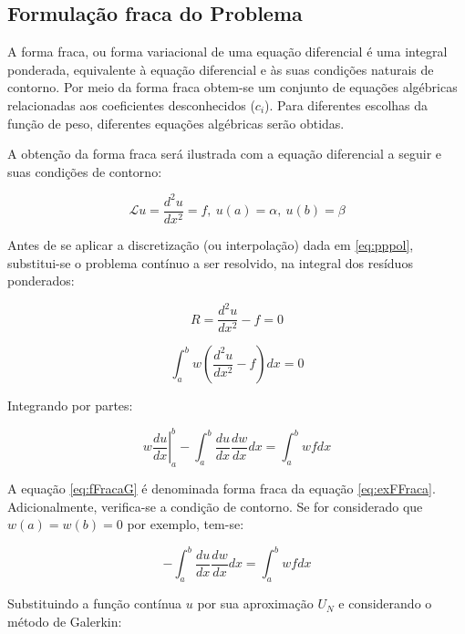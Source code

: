 \subsection{Formulação fraca do Problema}

A forma fraca, ou forma variacional de uma equação diferencial é uma integral ponderada, equivalente à equação diferencial e às suas condições naturais de contorno. Por meio da forma fraca obtem-se um conjunto de equações algébricas relacionadas aos coeficientes desconhecidos ($c_i$). Para diferentes escolhas da função de peso, diferentes equações algébricas serão obtidas.
\citep[p. 64]{reddy}

A obtenção da forma fraca será ilustrada com a equação diferencial a seguir e suas condições de contorno:

\begin{equation}
	\label{eq:exFFraca}
	\mathcal{L}u = \frac{d^2 u}{dx^2} = f, \ u(a) = \alpha, \ u(b) = \beta
\end{equation}

Antes de se aplicar a discretização (ou interpolação) dada em \ref{eq:pppol}, substitui-se o problema contínuo a ser resolvido, na integral dos resíduos ponderados:

\begin{equation}
	R = \frac{d^2 u}{dx^2} - f = 0
\end{equation}

 \begin{equation}
	\int_{a}^{b} w\left(\frac{d^2 u}{dx^2} - f\right) dx = 0
 \end{equation} 
 
 Integrando por partes:
 
 \begin{equation}
 \label{eq:fFracaG}
 \left.w \frac{du}{dx}\right|_{a}^{b} - 
	\int_{a}^{b} 
	\frac{du}{dx} \frac{dw}{dx} dx = \int_{a}^{b} wf dx
 \end{equation} 

A equação \ref{eq:fFracaG} é denominada forma fraca da equação \ref{eq:exFFraca}. Adicionalmente, verifica-se a condição de contorno. Se for considerado que $ w(a) = w(b) = 0$ por exemplo, tem-se:

 \begin{equation}
 - 	\int_{a}^{b} 
	\frac{du}{dx} \frac{dw}{dx} dx = \int_{a}^{b} wf dx
 \end{equation} 
 
 Substituindo a função contínua $u$ por sua aproximação $U_N$ e considerando o método de Galerkin:
 
